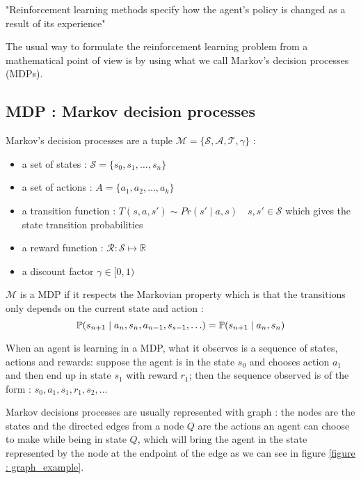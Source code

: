 \documentclass[14pt,a4paper]{article}
\theoremstyle{definition}
\begin{document}
"Reinforcement learning methods specify how the agent's policy is changed as a result of its experience"\citep{Sutton}



The usual way to formulate the reinforcement learning problem from a mathematical point of view is by using what we call Markov's decision processes (MDPs).

\subsection{MDP : Markov decision processes}



Markov's decision processes are a tuple \citep{Xia2015} $\mathcal{M}=\{\mathcal{S},\mathcal{A},\mathcal{T},\gamma\}$ : 

\begin{itemize}
\item a set of states : $\mathcal{S}=\{s_0,s_1,\ldots,s_n\}$
\item a set of actions  : $A=\{a_1,a_2,\ldots ,a_k\}$
\item a transition function :  $T(s,a,s') \sim  Pr(s'\mid a, s) \quad s,s' \in \mathcal{S}$ which gives the state transition probabilities
\item a reward function : $\mathcal{R}:\mathcal{S}\mapsto \mathbb{R} $
\item a discount factor $\gamma \in [0,1)$
\end{itemize}


$\mathcal{M}$ is a MDP if it respects the Markovian property which is that the transitions only depends on the current state and action : 
\begin{equation}
\mathbb{P}(s_{n+1}\mid a_{n},s_{n},a_{n-1},s_{s-1},\ldots)=\mathbb{P}(s_{n+1}\mid a_{n},s_{n})\\
\end{equation}

When an agent is learning in a MDP, what it observes is a sequence of states, actions and rewards: suppose the agent is in the state $s_0$ and chooses action $a_1$ and then end up in state $s_1$ with reward $r_1$; then the sequence observed is of the form : $s_0,a_1,s_1,r_1,s_2,\ldots$

Markov decisions processes are usually represented with graph : the nodes are the states and the directed edges from a node $Q$ are the actions an agent can choose to make while being in state $Q$, which will bring the agent in the state represented by the node at the endpoint of the edge as we can see in figure \ref{figure : graph_example}.
\end{document}
